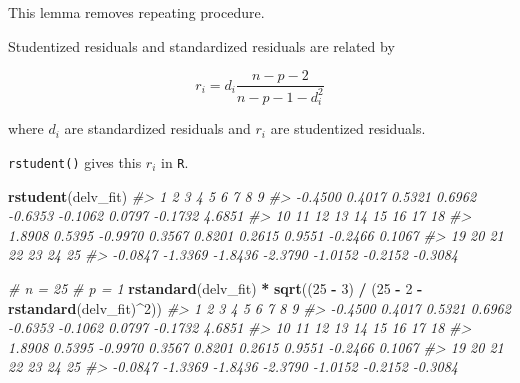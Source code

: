 \documentclass[]{book}
\newenvironment{Shaded}{\begin{snugshade}}{\end{snugshade}}
\newcommand{\CommentTok}[1]{\textcolor[rgb]{0.56,0.35,0.01}{\textit{#1}}}
\newcommand{\DecValTok}[1]{\textcolor[rgb]{0.00,0.00,0.81}{#1}}
\newcommand{\KeywordTok}[1]{\textcolor[rgb]{0.13,0.29,0.53}{\textbf{#1}}}
\newcommand{\NormalTok}[1]{#1}
\newcommand{\OperatorTok}[1]{\textcolor[rgb]{0.81,0.36,0.00}{\textbf{#1}}}
\newcommand{\StringTok}[1]{\textcolor[rgb]{0.31,0.60,0.02}{#1}}
\theoremstyle{definition}
\theoremstyle{definition}
\theoremstyle{definition}
\theoremstyle{remark}
\let\BeginKnitrBlock\begin \let\EndKnitrBlock\end
\begin{document}
This lemma removes repeating procedure.

\BeginKnitrBlock{corollary}
\protect\hypertarget{cor:unnamed-chunk-125}{}{\label{cor:unnamed-chunk-125} }Studentized residuals and standardized residuals are related by

\[r_i = d_i \frac{n - p - 2}{n - p - 1 - d_i^2}\]

where \(d_i\) are standardized residuals and \(r_i\) are studentized residuals.
\EndKnitrBlock{corollary}

\texttt{rstudent()} gives this \(r_i\) in \texttt{R}.

\begin{Shaded}
\begin{Highlighting}[]
\KeywordTok{rstudent}\NormalTok{(delv_fit)}
\CommentTok{#>       1       2       3       4       5       6       7       8       9 }
\CommentTok{#> -0.4500  0.4017  0.5321  0.6962 -0.6353 -0.1062  0.0797 -0.1732  4.6851 }
\CommentTok{#>      10      11      12      13      14      15      16      17      18 }
\CommentTok{#>  1.8908  0.5395 -0.9970  0.3567  0.8201  0.2615  0.9551 -0.2466  0.1067 }
\CommentTok{#>      19      20      21      22      23      24      25 }
\CommentTok{#> -0.0847 -1.3369 -1.8436 -2.3790 -1.0152 -0.2152 -0.3084}
\end{Highlighting}
\end{Shaded}

\begin{Shaded}
\begin{Highlighting}[]
\CommentTok{# n = 25}
\CommentTok{# p = 1}
\KeywordTok{rstandard}\NormalTok{(delv_fit) }\OperatorTok{*}\StringTok{ }\KeywordTok{sqrt}\NormalTok{((}\DecValTok{25} \OperatorTok{-}\StringTok{ }\DecValTok{3}\NormalTok{) }\OperatorTok{/}\StringTok{ }\NormalTok{(}\DecValTok{25} \OperatorTok{-}\StringTok{ }\DecValTok{2} \OperatorTok{-}\StringTok{ }\KeywordTok{rstandard}\NormalTok{(delv_fit)}\OperatorTok{^}\DecValTok{2}\NormalTok{))}
\CommentTok{#>       1       2       3       4       5       6       7       8       9 }
\CommentTok{#> -0.4500  0.4017  0.5321  0.6962 -0.6353 -0.1062  0.0797 -0.1732  4.6851 }
\CommentTok{#>      10      11      12      13      14      15      16      17      18 }
\CommentTok{#>  1.8908  0.5395 -0.9970  0.3567  0.8201  0.2615  0.9551 -0.2466  0.1067 }
\CommentTok{#>      19      20      21      22      23      24      25 }
\CommentTok{#> -0.0847 -1.3369 -1.8436 -2.3790 -1.0152 -0.2152 -0.3084}
\end{Highlighting}
\end{Shaded}
\end{document}

